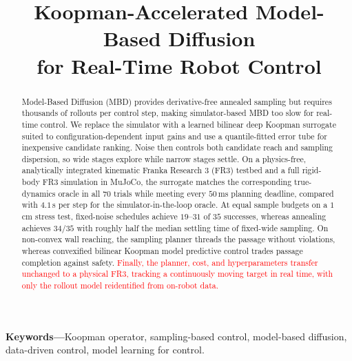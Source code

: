 \documentclass[letterpaper,10pt,conference]{ieeeconf}
\newcommand{\nd}[1]{\textcolor{red}{#1}}
\begin{document}

\title{Koopman-Accelerated Model-Based Diffusion\\for Real-Time Robot Control}


\maketitle

\begin{abstract}
Model-Based Diffusion (MBD) provides derivative-free annealed sampling but requires thousands of rollouts per control step, making simulator-based MBD too slow for real-time control.
We replace the simulator with a learned bilinear deep Koopman surrogate suited to configuration-dependent input gains and use a quantile-fitted error tube for inexpensive candidate ranking.
Noise then controls both candidate reach and sampling dispersion, so wide stages explore while narrow stages settle.
On a physics-free, analytically integrated kinematic Franka Research 3 (FR3) testbed and a full rigid-body FR3 simulation in MuJoCo, the surrogate matches the corresponding true-dynamics oracle in all $70$ trials while meeting every $50$\,ms planning deadline, compared with $4.1$\,s per step for the simulator-in-the-loop oracle.
At equal sample budgets on a $1$\,cm stress test, fixed-noise schedules achieve $19$--$31$ of $35$ successes, whereas annealing achieves $34/35$ with roughly half the median settling time of fixed-wide sampling.
On non-convex wall reaching, the sampling planner threads the passage without violations, whereas convexified bilinear Koopman model predictive control trades passage completion against safety.
\nd{Finally, the planner, cost, and hyperparameters transfer unchanged to a physical FR3, tracking a continuously moving target in real time, with only the rollout model reidentified from on-robot data.}
\end{abstract}

\noindent\textbf{Keywords---}Koopman operator, sampling-based control,
model-based diffusion, data-driven control, model learning for control.

\end{document}
